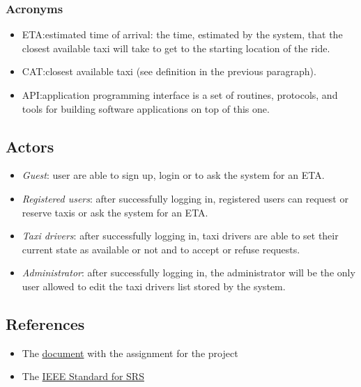 \documentclass{article}
\begin{document}
\subsubsection{Acronyms}
\begin{itemize}
	\item ETA:\@ estimated time of arrival: the time, estimated by the system, that the closest available taxi will take to get to the starting location of the ride.
	\item CAT:\@ closest available taxi (see definition in the previous paragraph).
	\item API:\@ application programming interface is a set of routines, protocols, and tools for building software applications on top of this one.
\end{itemize}
\subsection{Actors}
\begin{itemize}
	\item \textit{Guest}: user are able to sign up, login or to ask the system for an ETA.\@
	\item \textit{Registered users}: after successfully logging in, registered users can request or reserve taxis or ask the system for an ETA.\@
	\item \textit{Taxi drivers}: after successfully logging in, taxi drivers are able to set their current state as available or not and to accept or refuse requests.
	\item \textit{Administrator}: after successfully logging in, the administrator will be the only user allowed to edit the taxi drivers list stored by the system.
\end{itemize}

\subsection{References}
\begin{itemize}
	\item The \href{run:./external_references/assignments.pdf}{document} with the assignment for the project
	\item The \href{run:./external_references/assignments.pdf}{IEEE Standard for SRS } 
\end{itemize}
\end{document}
